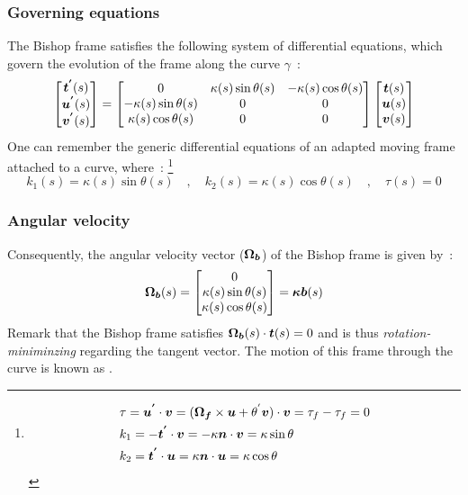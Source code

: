 \subsubsection{Governing equations}
The Bishop frame satisfies the following system of differential equations, which govern the evolution of the frame along the curve $\gamma$~:
\begin{equation}
	\begin{bmatrix}
		\boldsymbol{t^{'}}(s) \\
		\boldsymbol{u^{'}}(s) \\
		\boldsymbol{v^{'}}(s)
	\end{bmatrix}
	=
	\begin{bmatrix}
		0 & \kappa(s) \sin \theta(s) & -\kappa(s) \cos \theta(s) \\
		-\kappa(s) \sin \theta(s) & 0 & 0 \\
		\kappa(s) \cos \theta(s) & 0 & 0
	\end{bmatrix}
	\begin{bmatrix}
		\boldsymbol{t}(s) \\
		\boldsymbol{u}(s) \\
		\boldsymbol{v}(s)
	\end{bmatrix}
\label{eq:3_12}
\end{equation}
One can remember the generic differential equations of an adapted moving frame attached to a curve, where~: \footnote{
\begin{equation*}
	\begin{aligned}
		&\tau =\boldsymbol{u^{'}} \cdot \boldsymbol{v} = (\boldsymbol{\Omega_f} \times \boldsymbol{u} + \theta^{'} \boldsymbol{v})\cdot  \boldsymbol{v} = \tau_f - \tau_f = 0\\
		&k_1 = -\boldsymbol{t^{'}} \cdot \boldsymbol{v} = -\kappa \boldsymbol{n} \cdot \boldsymbol{v} = \kappa \sin \theta \\
		&k_2 = \boldsymbol{t^{'}} \cdot \boldsymbol{u} = \kappa \boldsymbol{n} \cdot \boldsymbol{u} = \kappa \cos \theta
	\end{aligned}
\end{equation*}
}
\begin{equation}
k_{1}(s) = \kappa(s) \sin \theta(s)
\quad,\quad
k_{2}(s) = \kappa(s) \cos \theta(s)
\quad,\quad
\tau(s) = 0
\end{equation}

\subsubsection{Angular velocity}\label{sec:bishopvelocity}
Consequently, the angular velocity vector ($\boldsymbol{\Omega_{b}}$) of the Bishop frame is given by~:
\begin{equation}
	\boldsymbol{\Omega_b}(s) 
	=
	\begin{bmatrix}
		0\\
		\kappa(s) \sin \theta(s)\\
		\kappa(s) \cos \theta(s)
	\end{bmatrix}
	= \boldsymbol{\kappa b}(s) 
\end{equation}
Remark that the Bishop frame satisfies $\boldsymbol{\Omega_b}(s) \cdot \boldsymbol{t}(s) = 0$ and is thus \emph{rotation-miniminzing} regarding the tangent vector. The motion of this frame through the curve is known as .

